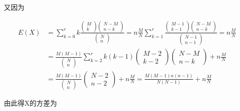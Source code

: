 又因为

\[
\begin{array}{ll}
{E(X)} & {=\sum_{k=0}^{r} k \frac{\left( \begin{array}{c}{M} \\
		{k}
		\end{array}
		\right) \left( 
		\begin{array}{c}
		{N-M} \\ 
		{n-k}
		\end{array}
		\right)}{\left( 
		\begin{array}{c}
		{N} \\ 
		{n}
		\end{array}
		\right)}=n \frac{M}{N} \sum_{k=1}^{r} \frac{\left( \begin{array}{c}
		{M-1} \\ 
		{k-1}
		\end{array}
		\right) \left( 
		\begin{array}{c}
		{N-M} \\ 
		{n-k}
		\end{array}
		\right)}{\left( 
		\begin{array}{c}
		{N-1} \\ 
		{n-1}
		\end{array}
		\right)}=n \frac{M}{N}} \\
{} & {=\frac{M(M-1)}{\left( 
		\begin{array}{l}{N} \\ 
		{n}
		\end{array}
		\right)} \sum_{k=2}^{r} k(k-1) \left( 
	\begin{array}{c}
	{M-2} \\ 
	{k-2}
	\end{array}
	\right) \left( 
	\begin{array}{c}{N-M} \\ 
	{n-k}
	\end{array}
	\right)+n \frac{M}{N}} \\
{} & {=\frac{M(M-1)}{\left( 
		\begin{array}{l}
		{N} \\ 
		{n}\end{array}
		\right)} \left( 
	\begin{array}{l}
	{N-2} \\ 
	{n-2}
	\end{array}
	\right)+n \frac{M}{N}=\frac{M(M-1) n(n-1)}{N(N-1)}+n \frac{M}{N}} 
\end{array}
\]

由此得X的方差为

